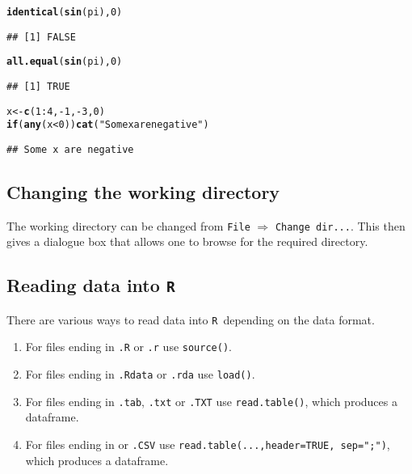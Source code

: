\documentclass[12pt,A4,makeidx]{article}\usepackage[]{graphicx}\usepackage[]{xcolor}
\makeatletter
\newcommand{\hlnum}[1]{\textcolor[rgb]{0.686,0.059,0.569}{#1}}%
\newcommand{\hlstr}[1]{\textcolor[rgb]{0.192,0.494,0.8}{#1}}%
\newcommand{\hlopt}[1]{\textcolor[rgb]{0,0,0}{#1}}%
\newcommand{\hlstd}[1]{\textcolor[rgb]{0.345,0.345,0.345}{#1}}%
\newcommand{\hlkwa}[1]{\textcolor[rgb]{0.161,0.373,0.58}{\textbf{#1}}}%
\newcommand{\hlkwb}[1]{\textcolor[rgb]{0.69,0.353,0.396}{#1}}%
\newcommand{\hlkwd}[1]{\textcolor[rgb]{0.737,0.353,0.396}{\textbf{#1}}}%
\newenvironment{kframe}{%
 \def\at@end@of@kframe{}%
 \ifinner\ifhmode%
  \def\at@end@of@kframe{\end{minipage}}%
  \begin{minipage}{\columnwidth}%
 \fi\fi%
 \def\FrameCommand##1{\hskip\@totalleftmargin \hskip-\fboxsep
 \colorbox{shadecolor}{##1}\hskip-\fboxsep
     \hskip-\linewidth \hskip-\@totalleftmargin \hskip\columnwidth}%
 \MakeFramed {\advance\hsize-\width
   \@totalleftmargin\z@ \linewidth\hsize
   \@setminipage}}%
 {\par\unskip\endMakeFramed%
 \at@end@of@kframe}
\newenvironment{knitrout}{}{} %
\newcommand{\tR}{\texttt{R}}
\makeatother
\begin{document}
\begin{knitrout}
\color{fgcolor}\begin{kframe}
\begin{alltt}
\hlkwd{identical}\hlstd{(}\hlkwd{sin}\hlstd{(pi),}\hlnum{0}\hlstd{)}
\end{alltt}
\begin{verbatim}
## [1] FALSE
\end{verbatim}
\begin{alltt}
\hlkwd{all.equal}\hlstd{(}\hlkwd{sin}\hlstd{(pi),}\hlnum{0}\hlstd{)}
\end{alltt}
\begin{verbatim}
## [1] TRUE
\end{verbatim}
\begin{alltt}
\hlstd{x}\hlkwb{<-}\hlkwd{c}\hlstd{(}\hlnum{1}\hlopt{:}\hlnum{4}\hlstd{,}\hlopt{-}\hlnum{1}\hlstd{,}\hlopt{-}\hlnum{3}\hlstd{,}\hlnum{0}\hlstd{)}
\hlkwa{if}\hlstd{(}\hlkwd{any}\hlstd{(x}\hlopt{<}\hlnum{0}\hlstd{))} \hlkwd{cat}\hlstd{(}\hlstr{"Some x are negative"}\hlstd{)}
\end{alltt}
\begin{verbatim}
## Some x are negative
\end{verbatim}
\end{kframe}
\end{knitrout}

\subsection{Changing the working directory}
The working directory can be changed from \texttt{File} $\Rightarrow$ \texttt{Change dir...}. This then gives a dialogue box that allows one to browse
for the required directory.

\subsection{Reading data into \texttt{R}}
There are various ways to read data into \tR\ depending on the data format.
\begin{enumerate}
\item For files ending in \texttt{.R} or \texttt{.r} use \texttt{source()}.
\item For files ending in \texttt{.Rdata} or \texttt{.rda} use \texttt{load()}.
\item For files ending in \texttt{.tab}, \texttt{.txt} or \texttt{.TXT} use \texttt{read.table()}, which produces a dataframe.
\item For files ending in  or \texttt{.CSV} use \texttt{read.table(...,header=TRUE, sep=";")}, which produces a dataframe.
\end{enumerate}
\end{document}
